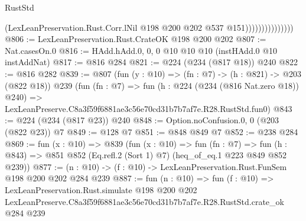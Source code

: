 \begin{lexlean}{RustStd}
\begin{coremodule}
                                (LexLeanPreservation.Rust.Corr.lNil
                                  @198
                                  @200
                                  @202
                                  @537
                                  @151)))))))))))))))
@806 := LexLeanPreservation.Rust.CrateOK @198 @200 @202
@807 := Nat.casesOn.{0}
@816 := HAdd.hAdd.{0, 0, 0} @10 @10 @10 (instHAdd.{0} @10 instAddNat)
@817 := @816 @284
@821 := @224 (@234 (@817 @18)) @240
@822 := @816 @282
@839 := @807
    (fun (y : @10) => (fn : @7) -> (h : @821) -> @203 (@822 @18))
    @239
    (fun (fn : @7) =>
    fun (h : @224 (@234 (@816 Nat.zero @18)) @240) =>
    LexLeanPreserve.C8a3f59f6881ae3c56e70cd31b7b7af7e.R28.RustStd.fun0)
@843 := @224 (@234 (@817 @23)) @240
@848 := Option.noConfusion.{0, 0} (@203 (@822 @23)) @7
@849 := @128 @7
@851 := @848 @849 @7
@852 := @238 @284
@869 := fun (x : @10) =>
  @839
    (fun (x : @10) =>
    fun (fn : @7) =>
    fun (h : @843) => @851 @852 (Eq.refl.{2} (Sort 1) @7) (heq_of_eq.{1} @223 @849 @852 @239))
@877 := (n : @10) -> (f : @10) -> LexLeanPreservation.Rust.FunSem @198 @200 @202 @284 @239
@887 := fun (n : @10) =>
  fun (f : @10) =>
  LexLeanPreservation.Rust.simulate
    @198
    @200
    @202
    LexLeanPreserve.C8a3f59f6881ae3c56e70cd31b7b7af7e.R28.RustStd.crate_ok
    @284
    @239
\end{coremodule}
\end{lexlean}
